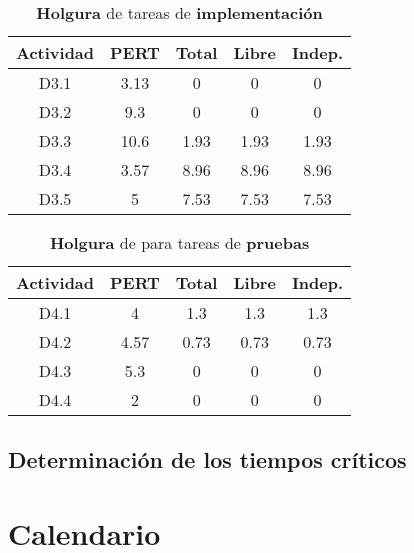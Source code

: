 \documentclass[11pt,a4paper,spanish,twoside]{report}
\begin{document}
{\begin{table}[!h]
\centering
  \begin{tabular}{|c||c||c|c|c|}
    \hline
     \textbf{Actividad} & \textbf{PERT} & \textbf{Total} & \textbf{Libre}
    & \textbf{Indep.}\\
    \hline \hline
    D3.1 & 3.13 & 0 & 0 & 0\\
    \hline
    D3.2 & 9.3 & 0 & 0 & 0\\
    \hline
    D3.3 & 10.6 & 1.93 & 1.93 & 1.93\\
    \hline
    D3.4 & 3.57 & 8.96 & 8.96 & 8.96\\
    \hline
    D3.5 & 5 & 7.53 & 7.53 & 7.53\\
    \hline
  \end{tabular}
  \caption{\textbf{Holgura} de tareas de \textbf{implementación}}
  \label{Tab:hol3}
\end{table}

\begin{table}[!h]
\centering
  \begin{tabular}{|c||c||c|c|c|}
    \hline
     \textbf{Actividad} & \textbf{PERT} & \textbf{Total} & \textbf{Libre}
    & \textbf{Indep.}\\
    \hline \hline
    D4.1 & 4 & 1.3 & 1.3 & 1.3\\
    \hline
    D4.2 & 4.57 & 0.73 & 0.73 & 0.73\\
    \hline
    D4.3 & 5.3 & 0 & 0 & 0\\
    \hline
    D4.4 & 2 & 0 & 0 & 0\\
    \hline
  \end{tabular}
  \caption{\textbf{Holgura} de para tareas de \textbf{pruebas}}
  \label{Tab:hol4}
\end{table}

\section{Determinación de los tiempos críticos}

\chapter{Calendario}

}
\end{document}
